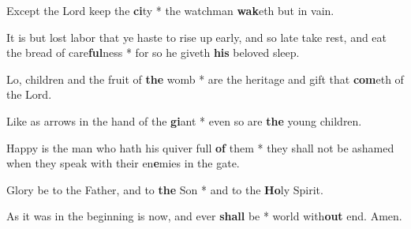 \begin{multicols}{2}
	Except the Lord keep the \textbf{ci}ty * the watchman \textbf{wak}eth but in vain.
	
	It is but lost labor that ye haste to rise up early, and so late take rest, and eat the bread of care\textbf{ful}ness * for so he giveth \textbf{his} beloved sleep.
	
	Lo, children and the fruit of \textbf{the} womb * are the heritage and gift that \textbf{com}eth of the Lord.
	
	Like as arrows in the hand of the \textbf{gi}ant * even so are \textbf{the} young children.
	
	Happy is the man who hath his quiver full \textbf{of} them * they shall not be ashamed when they speak with their en\textbf{e}mies in the gate.
	
	Glory be to the Father, and to \textbf{the} Son * and to the \textbf{Ho}ly Spirit.
	
	As it was in the beginning is now, and ever \textbf{shall} be * world with\textbf{out} end. Amen.
\end{multicols}